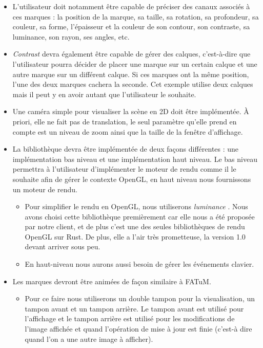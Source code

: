 \documentclass[12pt]{article}
\begin{document}
\begin{itemize}
\item L'utilisateur doit notamment être capable de préciser des \gls{canaux} associés à
ces marques : la position de la marque, sa taille, sa rotation, sa profondeur, sa couleur, sa forme,
l'épaisseur et la couleur de son contour, son contraste, sa luminance, son rayon, ses angles, etc.
\item \textit{Contrast} devra également être capable de gérer des calques, c'est-à-dire que l'utilisateur pourra
décider de placer une marque sur un certain calque et une autre marque sur un différent calque. Si ces
marques ont la même position, l'une des deux marques cachera la seconde. Cet exemple utilise deux calques
mais il peut y en avoir autant que l'utilisateur le souhaite.
\item Une caméra simple pour visualiser la scène en 2D doit être implémentée. À priori, elle ne fait pas
de translation, le seul paramètre qu'elle prend en compte est un niveau de zoom ainsi que la taille
de la fenêtre d'affichage.
\item La bibliothèque devra être implémentée de deux façons différentes : une implémentation bas niveau et une implémentation haut niveau.
		Le bas niveau permettra à l'utilisateur d'implémenter le moteur de rendu comme il le souhaite afin de gérer le contexte OpenGL, en haut niveau nous
		fournissons un moteur de rendu.
		\begin{itemize}
			\item Pour simplifier le rendu en OpenGL, nous utiliserons \textit{luminance} \cite{luminance}. Nous avons choisi cette bibliothèque
			premièrement car elle nous a été proposée par notre client, et de plus c'est une des seules bibliothèques de rendu OpenGL sur Rust. De plus, elle a l'air très prometteuse, la version 1.0 devant arriver sous peu.
			\item En haut-niveau nous aurons aussi besoin de gérer les événements clavier.
		\end{itemize}
\item Les marques devront être animées de façon similaire à FATuM.
	\begin{itemize}
	\item Pour ce faire nous utiliserons un double tampon pour la visualisation, un tampon avant et un tampon arrière.
	Le tampon avant est utilisé pour l'affichage et le tampon arrière est utilisé pour les modifications de l'image affichée et quand l'opération de mise
	à jour est finie (c'est-à dire quand l'on a une autre image à afficher).

\end{itemize}
\end{itemize}
\end{document}

